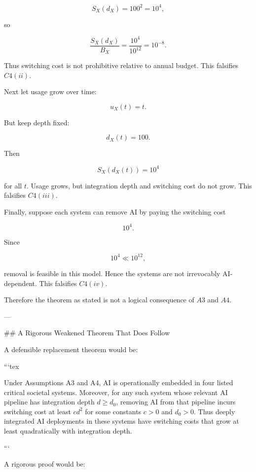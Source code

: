 \[
S_X(d_X)=100^2=10^4,
\]

so

\[
\frac{S_X(d_X)}{B_X}
=
\frac{10^4}{10^{12}}
=
10^{-8}.
\]

Thus switching cost is not prohibitive relative to annual budget. This falsifies \(C4(ii)\).

Next let usage grow over time:

\[
u_X(t)=t.
\]

But keep depth fixed:

\[
d_X(t)=100.
\]

Then

\[
S_X(d_X(t))=10^4
\]

for all \(t\). Usage grows, but integration depth and switching cost do not grow. This falsifies \(C4(iii)\).

Finally, suppose each system can remove AI by paying the switching cost

\[
10^4.
\]

Since

\[
10^4 \ll 10^{12},
\]

removal is feasible in this model. Hence the systems are not irrevocably AI-dependent. This falsifies \(C4(iv)\).

Therefore the theorem as stated is not a logical consequence of \(A3\) and \(A4\).

---

## A Rigorous Weakened Theorem That Does Follow

A defensible replacement theorem would be:

```tex
\begin{theorem}
Under Assumptions A3 and A4, AI is operationally embedded in four listed
critical societal systems. Moreover, for any such system whose relevant
AI pipeline has integration depth $d \ge d_0$, removing AI from that pipeline
incurs switching cost at least $c d^2$ for some constants $c>0$ and $d_0>0$.
Thus deeply integrated AI deployments in these systems have switching costs
that grow at least quadratically with integration depth.
\end{theorem}
```

A rigorous proof would be:

